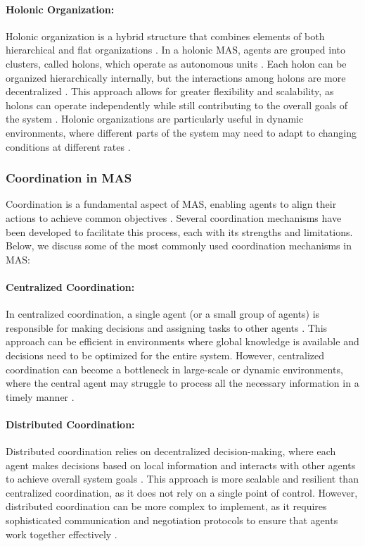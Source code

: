 \paragraph{Holonic Organization:}
Holonic organization is a hybrid structure that combines elements of both hierarchical and flat organizations \cite{durfee1999distributed}. In a holonic MAS, agents are grouped into clusters, called holons, which operate as autonomous units \cite{weiss1999multiagent}. Each holon can be organized hierarchically internally, but the interactions among holons are more decentralized \cite{durfee1999distributed}. This approach allows for greater flexibility and scalability, as holons can operate independently while still contributing to the overall goals of the system \cite{weiss1999multiagent}. Holonic organizations are particularly useful in dynamic environments, where different parts of the system may need to adapt to changing conditions at different rates \cite{durfee1999distributed}.

\subsubsection{Coordination in MAS}

Coordination is a fundamental aspect of MAS, enabling agents to align their actions to achieve common objectives \cite{wooldridge2009introduction}. Several coordination mechanisms have been developed to facilitate this process, each with its strengths and limitations. Below, we discuss some of the most commonly used coordination mechanisms in MAS:

\paragraph{Centralized Coordination:}
In centralized coordination, a single agent (or a small group of agents) is responsible for making decisions and assigning tasks to other agents \cite{jennings1998roadmap}. This approach can be efficient in environments where global knowledge is available and decisions need to be optimized for the entire system. However, centralized coordination can become a bottleneck in large-scale or dynamic environments, where the central agent may struggle to process all the necessary information in a timely manner \cite{weiss1999multiagent}.

\paragraph{Distributed Coordination:}
Distributed coordination relies on decentralized decision-making, where each agent makes decisions based on local information and interacts with other agents to achieve overall system goals \cite{durfee1999distributed}. This approach is more scalable and resilient than centralized coordination, as it does not rely on a single point of control. However, distributed coordination can be more complex to implement, as it requires sophisticated communication and negotiation protocols to ensure that agents work together effectively \cite{jennings1998roadmap}.

